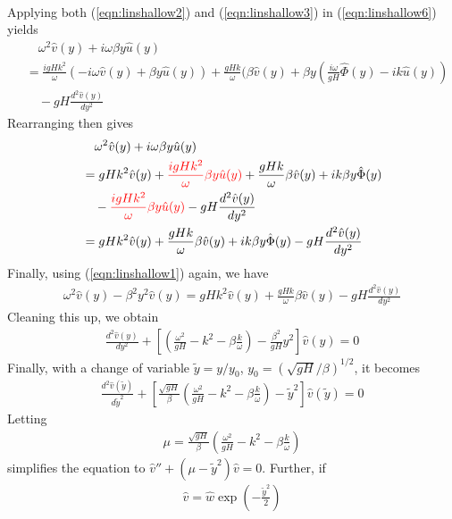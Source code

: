 \begin{solution}
\begin{align}
\end{align}
Applying both (\ref{eqn:linshallow2}) and (\ref{eqn:linshallow3}) in (\ref{eqn:linshallow6}) yields
\begin{align*}
&\quad \omega^2 \hat{v}(y) + i \omega\beta y \hat{u}(y) \\
&= \frac{i gHk^2}{\omega}(-i\omega \hat{v}(y) + \beta y \hat{u}(y)) + \frac{gHk}{\omega}(\beta\hat{v}(y) + \beta y (\frac{i \omega}{gH} \hat{\Phi}(y) - i k\hat{u}(y)) \\
&\quad - gH \frac{d^2\hat{v}(y)}{dy^2}    
\end{align*}
Rearranging then gives
\begin{align*}
&\quad \omega^2 \hat{v}(y) + i \omega\beta y \hat{u}(y) \\
&= gHk^2 \hat{v}(y) + \textcolor{red}{\frac{i gHk^2}{\omega} \beta y \hat{u}(y)} + \frac{gHk}{\omega}\beta\hat{v}(y) + i k \beta y \hat{\Phi}(y) \\
&\quad - \textcolor{red}{\frac{i gHk^2}{\omega} \beta y \hat{u}(y)} - gH \frac{d^2\hat{v}(y)}{dy^2} \\
&= gHk^2 \hat{v}(y)  + \frac{gHk}{\omega}\beta\hat{v}(y) + i k \beta y \hat{\Phi}(y) - gH \frac{d^2\hat{v}(y)}{dy^2}
\end{align*}
Finally, using (\ref{eqn:linshallow1}) again, we have
\begin{align*}
\omega^2 \hat{v}(y) - \beta^2 y^2 \hat{v}(y) = gHk^2 \hat{v}(y)  + \frac{gHk}{\omega}\beta\hat{v}(y) - gH \frac{d^2\hat{v}(y)}{dy^2}    
\end{align*}
Cleaning this up, we obtain
\begin{align*}
\frac{d^2\hat{v}(y)}{dy^2} + [(\frac{\omega^2}{gH} - k^2 - \beta\frac{k}{\omega}) - \frac{\beta^2}{gH}y^2]\hat{v}(y) = 0
\end{align*}
Finally, with a change of variable $\tilde{y} = y/y_0$, $y_0 = (\sqrt{gH}/\beta)^{1/2}$, it becomes
\begin{align*}
\frac{d^2\hat{v}(\tilde{y})}{d\tilde{y}^2} + [\frac{\sqrt{gH}}{\beta}(\frac{\omega^2}{gH} - k^2 - \beta\frac{k}{\omega}) - \tilde{y}^2]\hat{v}(\tilde{y}) = 0   
\end{align*}
Letting 
\begin{align*}
\mu = \frac{\sqrt{gH}}{\beta}(\frac{\omega^2}{gH} - k^2 - \beta\frac{k}{\omega})
\end{align*}
simplifies the equation to $\hat{v}'' + (\mu - \tilde{y}^2)\hat{v} = 0$. Further, if
\begin{align*}
\hat{v} = \hat{w} \exp(-\frac{\tilde{y}^2}{2})

\end{align*}
\end{solution}
